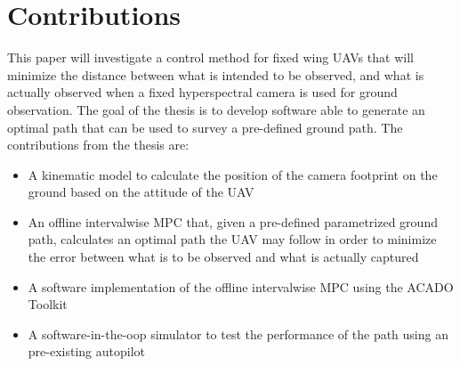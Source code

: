 \section{Contributions}

This paper will investigate a control method for fixed wing UAVs that will minimize the distance between what is intended to be observed, and what is actually observed when a fixed hyperspectral camera is used for ground observation. The goal of the thesis is to develop software able to generate an optimal path that can be used to survey a pre-defined ground path. The contributions from the thesis are:

\begin{itemize}
    \item A kinematic model to calculate the position of the camera footprint on the ground based on the attitude of the UAV
    \item An offline intervalwise MPC that, given a pre-defined parametrized ground path, calculates an optimal path the UAV may follow in order to minimize the error between what is to be observed and what is actually captured
    \item A software implementation of the offline intervalwise MPC using the ACADO Toolkit
    \item A software-in-the-oop simulator to test the performance of the path using an pre-existing autopilot
\end{itemize}